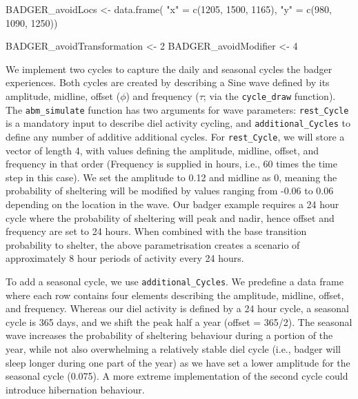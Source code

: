 \documentclass[10pt,a4paper]{article}
\newenvironment{Shaded}{}{}
\newcommand{\DecValTok}[1]{#1}
\newcommand{\FunctionTok}[1]{#1}
\newcommand{\NormalTok}[1]{#1}
\newcommand{\OtherTok}[1]{#1}
\newcommand{\StringTok}[1]{#1}
\begin{document}
\begin{Shaded}
\begin{Highlighting}[]
\NormalTok{BADGER\_avoidLocs }\OtherTok{\textless{}{-}} \FunctionTok{data.frame}\NormalTok{(}
  \StringTok{"x"} \OtherTok{=} \FunctionTok{c}\NormalTok{(}\DecValTok{1205}\NormalTok{, }\DecValTok{1500}\NormalTok{, }\DecValTok{1165}\NormalTok{),}
  \StringTok{"y"} \OtherTok{=} \FunctionTok{c}\NormalTok{(}\DecValTok{980}\NormalTok{, }\DecValTok{1090}\NormalTok{, }\DecValTok{1250}\NormalTok{))}

\NormalTok{BADGER\_avoidTransformation }\OtherTok{\textless{}{-}} \DecValTok{2}
\NormalTok{BADGER\_avoidModifier }\OtherTok{\textless{}{-}} \DecValTok{4}
\end{Highlighting}
\end{Shaded}

We implement two cycles to capture the daily and seasonal cycles the badger experiences.
Both cycles are created by describing a Sine wave defined by its amplitude, midline, offset (\(\phi\)) and frequency (\(\tau\); via the \texttt{cycle\_draw} function).
The \texttt{abm\_simulate} function has two arguments for wave parameters: \texttt{rest\_Cycle} is a mandatory input to describe diel activity cycling, and \texttt{additional\_Cycles} to define any number of additive additional cycles.
For \texttt{rest\_Cycle}, we will store a vector of length 4, with values defining the amplitude, midline, offset, and frequency in that order (Frequency is supplied in hours, i.e., 60 times the time step in this case).
We set the amplitude to 0.12 and midline as 0, meaning the probability of sheltering will be modified by values ranging from -0.06 to 0.06 depending on the location in the wave.
Our badger example requires a 24 hour cycle where the probability of sheltering will peak and nadir, hence offset and frequency are set to 24 hours.
When combined with the base transition probability to shelter, the above parametrisation creates a scenario of approximately 8 hour periods of activity every 24 hours.

To add a seasonal cycle, we use \texttt{additional\_Cycles}.
We predefine a data frame where each row contains four elements describing the amplitude, midline, offset, and frequency.
Whereas our diel activity is defined by a 24 hour cycle, a seasonal cycle is 365 days, and we shift the peak half a year (offset = 365/2).
The seasonal wave increases the probability of sheltering behaviour during a portion of the year, while not also overwhelming a relatively stable diel cycle (i.e., badger will sleep longer during one part of the year) as we have set a lower amplitude for the seasonal cycle (0.075).
A more extreme implementation of the second cycle could introduce hibernation behaviour.
\end{document}

